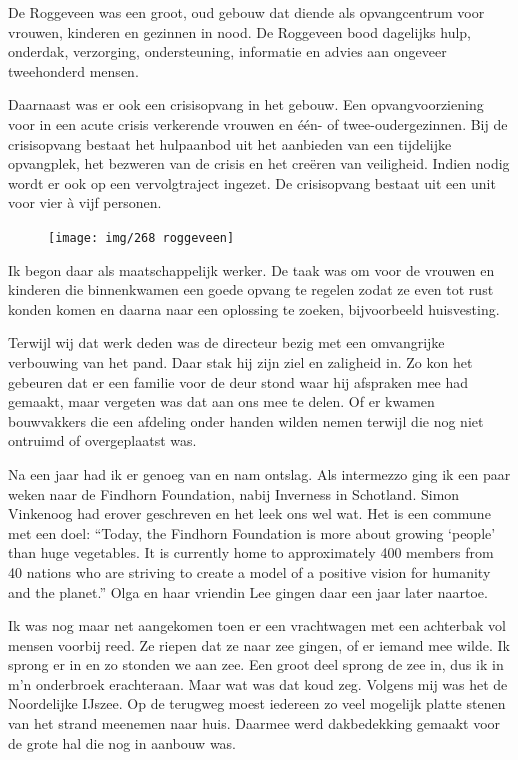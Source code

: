 \documentclass[10pt,twoside, openright]{memoir}
\begin{document}
De Roggeveen was een groot, oud gebouw dat diende als opvangcentrum voor vrouwen, kinderen en gezinnen in nood. De Roggeveen bood dagelijks hulp, onderdak, verzorging, ondersteuning, informatie en advies aan ongeveer tweehonderd mensen.

Daarnaast was er ook een crisisopvang in het gebouw. Een opvangvoorziening voor in een acute crisis verkerende vrouwen en één- of twee-oudergezinnen. Bij de crisisopvang bestaat het hulpaanbod uit het aanbieden van een tijdelijke opvangplek, het bezweren van de crisis en het creëren van veiligheid. Indien nodig wordt er ook op een vervolgtraject ingezet. De crisisopvang bestaat uit een unit voor vier à vijf personen.

\begin{figure}
\texttt{[image: img/268 roggeveen]}
\end{figure}

Ik begon daar als maatschappelijk werker. De taak was om voor de vrouwen en kinderen die binnenkwamen een goede opvang te regelen zodat ze even tot rust konden komen en daarna naar een oplossing te zoeken, bijvoorbeeld huisvesting. 

Terwijl wij dat werk deden was de directeur bezig met een omvangrijke verbouwing van het pand. Daar stak hij zijn ziel en zaligheid in. Zo kon het gebeuren dat er een familie voor de deur stond waar hij afspraken mee had gemaakt, maar vergeten was dat aan ons mee te delen. Of er kwamen bouwvakkers die een afdeling onder handen wilden nemen terwijl die nog niet ontruimd of overgeplaatst was. 

Na een jaar had ik er genoeg van en nam ontslag. Als intermezzo ging ik een paar weken naar de Findhorn Foundation, nabij Inverness in Schotland. Simon Vinkenoog had erover geschreven en het leek ons wel wat. Het is een commune met een doel: ``Today, the Findhorn Foundation is more about growing `people' than huge vegetables. It is currently home to approximately 400 members from 40 nations who are striving to create a model of a positive vision for humanity and the planet.'' Olga en haar vriendin Lee gingen daar een jaar later naartoe.

Ik was nog maar net aangekomen toen er een vrachtwagen met een achterbak vol mensen voorbij reed. Ze riepen dat ze naar zee gingen, of er iemand mee wilde. Ik sprong er in en zo stonden we aan zee. Een groot deel sprong de zee in, dus ik in m’n onderbroek erachteraan. Maar wat was dat koud zeg. Volgens mij was het de Noordelijke IJszee. Op de terugweg moest iedereen zo veel mogelijk platte stenen van het strand meenemen naar huis. Daarmee werd dakbedekking gemaakt voor de grote hal die nog in aanbouw was. 
\end{document}
